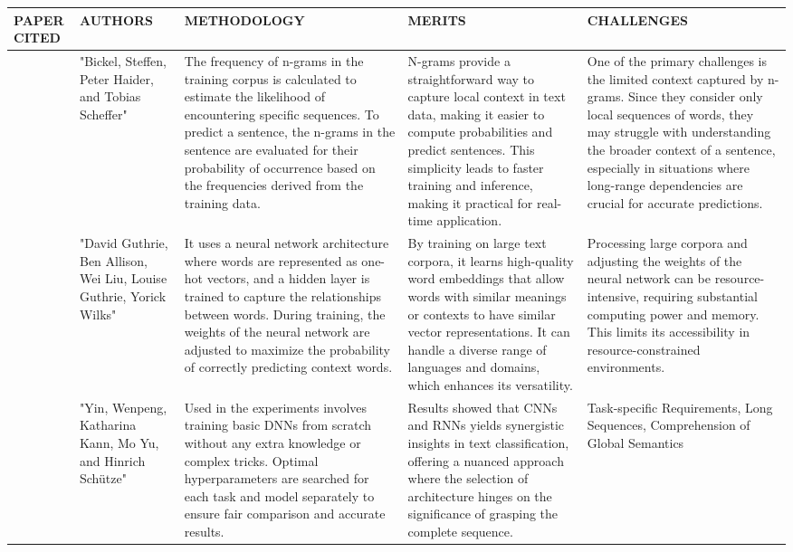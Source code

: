 \documentclass[fleqn,10pt]{thescipub} %
\begin{document}
\begin{table}
\begin{center}
 \centering
   \small %
    \begin{tabular}{ |p{1cm}|p{2cm}|p{4cm}|p{4cm}|p{4cm}| }
\hline
\centering PAPER CITED & \centering  AUTHORS & \centering METHODOLOGY &  \centering MERITS &  \centering CHALLENGES \arraybackslash \\ 
\hline
[12]  &  "Bickel, Steffen, Peter Haider, and Tobias Scheffer" &  The frequency of n-grams in the training corpus is calculated to estimate the likelihood of encountering specific sequences. To predict a sentence, the n-grams in the sentence are evaluated for their probability of occurrence based on the frequencies derived from the training data. &  N-grams provide a straightforward way to capture local context in text data, making it easier to compute probabilities and predict sentences. This simplicity leads to faster training and inference, making it practical for real-time application. &  One of the primary challenges is the limited context captured by n-grams. Since they consider only local sequences of words, they may struggle with understanding the broader context of a sentence, especially in situations where long-range dependencies are crucial for accurate predictions.  \\
\hline
[13]  & "David Guthrie, Ben Allison, Wei Liu, Louise Guthrie, Yorick Wilks" &  It uses a neural network architecture where words are represented as one-hot vectors, and a hidden layer is trained to capture the relationships between words. During training, the weights of the neural network are adjusted to maximize the probability of correctly predicting context words. &  By training on large text corpora, it learns high-quality word embeddings that allow words with similar meanings or contexts to have similar vector representations. It can handle a diverse range of languages and domains, which enhances its versatility. &  Processing large corpora and adjusting the weights of the neural network can be resource-intensive, requiring substantial computing power and memory. This limits its accessibility in resource-constrained environments.  \\
\hline
[14]  &  "Yin, Wenpeng, Katharina Kann, Mo Yu, and Hinrich Schütze" &  Used in the experiments involves training basic DNNs from scratch without any extra knowledge or complex tricks. Optimal hyperparameters are searched for each task and model separately to ensure fair comparison and accurate results. &  Results showed that CNNs and RNNs yields synergistic insights in text classification, offering a nuanced approach where the selection of architecture hinges on the significance of grasping the complete sequence. &  Task-specific Requirements, Long Sequences, Comprehension of Global Semantics  \\

\end{tabular}
\end{center}
\end{table}
\end{document}
